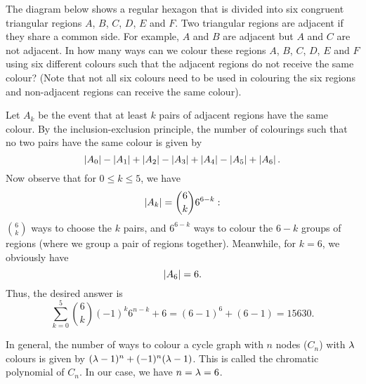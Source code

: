 \begin{question}[15630]\label{Q::2024-J-1-23}
    The diagram below shows a regular hexagon that is divided into six congruent triangular regions $A$, $B$, $C$, $D$, $E$ and $F$. Two triangular regions are adjacent if they share a common side. For example, $A$ and $B$ are adjacent but $A$ and $C$ are not adjacent. In how many ways can we colour these regions $A$, $B$, $C$, $D$, $E$ and $F$ using six different colours such that the adjacent regions do not receive the same colour? (Note that not all six colours need to be used in colouring the six regions and non-adjacent regions can receive the same colour).

    \begin{center}
    \end{center}
\end{question}
\begin{solution*}
    Let $A_k$ be the event that at least $k$ pairs of adjacent regions have the same colour. By the inclusion-exclusion principle, the number of colourings such that no two pairs have the same colour is given by \[\left\lvert A_0 \right\rvert - \left\lvert A_1 \right\rvert + \left\lvert A_2 \right\rvert - \left\lvert A_3 \right\rvert + \left\lvert A_4 \right\rvert - \left\lvert A_5 \right\rvert + \left\lvert A_6 \right\rvert.\] Now observe that for $0 \leq k \leq 5$, we have \[\left\lvert A_k \right\rvert = \binom{6}{k} 6^{6-k}:\] $\binom{6}{k}$ ways to choose the $k$ pairs, and $6^{6-k}$ ways to colour the $6-k$ groups of regions (where we group a pair of regions together). Meanwhile, for $k = 6$, we obviously have \[\left\lvert A_6 \right\rvert = 6.\] Thus, the desired answer is \[\sum_{k = 0}^5 \binom{6}{k} (-1)^k 6^{n-k} + 6 = (6-1)^6 + (6-1) = 15630.\]
    \begin{remark}
        In general, the number of ways to colour a cycle graph with $n$ nodes ($C_n$) with $\lambda$ colours is given by $(\lambda - 1)^n + (-1)^n (\lambda - 1)$. This is called the chromatic polynomial of $C_n$. In our case, we have $n = \lambda = 6$.
    \end{remark}
\end{solution*}

